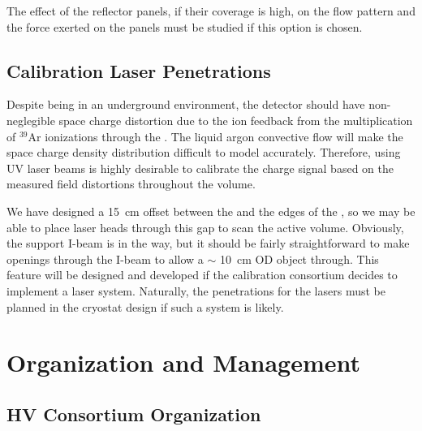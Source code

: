 The effect of the reflector panels, if their coverage is high, on the  flow pattern and the force exerted on the panels must be studied if this option is chosen.

\subsection{Calibration Laser Penetrations}

Despite being in an underground environment, the \dual detector should have non-neglegible space charge distortion due to the ion feedback from the multiplication of $^{39}$Ar ionizations through the . The liquid argon convective flow will make the space charge density distribution difficult to model accurately. Therefore, using UV laser beams is highly desirable to calibrate the charge signal based on the measured field distortions throughout the  volume.

We have designed a \SI{15}{\cm} offset between the  and the edges of the , so we may be able to place laser heads through this gap to scan the  active volume. Obviously, the  support I-beam is in the way, but it should be fairly straightforward to make openings through the I-beam to allow a $\sim $ \SI{10}{\cm} OD object through. This feature will be designed and developed if the calibration consortium decides to implement a laser system.  Naturally, the penetrations for the lasers must be planned in the cryostat design if such a system is likely.




\section{Organization and Management}
\label{sec:fddp-hv-org}

\subsection{HV Consortium Organization}
\label{sec:fddp-hv-org-consortium}

